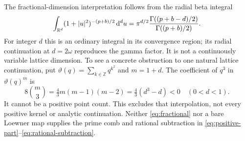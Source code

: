 The fractional-dimension interpretation follows from the radial beta
integral
\begin{equation}\label{eq:fractional}
 \int_{\mathbb R^d}(1+|u|^2)^{-(p+b)/2}\,\mathrm d^d u
 =\pi^{d/2}\frac{\Gamma((p+b-d)/2)}{\Gamma((p+b)/2)}.
\end{equation}
For integer $d$ this is an ordinary integral in its convergence region;
its radial continuation at $d=2\omega$ reproduces the gamma factor.
It is not a continuously variable lattice dimension. To see a concrete
obstruction to one natural lattice continuation, put
$\vartheta(q)=\sum_{k\in\mathbb Z}q^{k^2}$ and $m=1+d$.
The coefficient of $q^3$ in $\vartheta(q)^m$ is
\begin{equation}
 8\binom m3=\tfrac43m(m-1)(m-2)=\tfrac43(d^3-d)<0
 \quad(0<d<1).
\end{equation}
It cannot be a positive point count. This excludes that interpolation,
not every positive kernel or analytic continuation. Neither
\eqref{eq:fractional} nor a bare Loewner map supplies the prime comb and
rational subtraction in \eqref{eq:positive-part}--\eqref{eq:rational-subtraction}.
